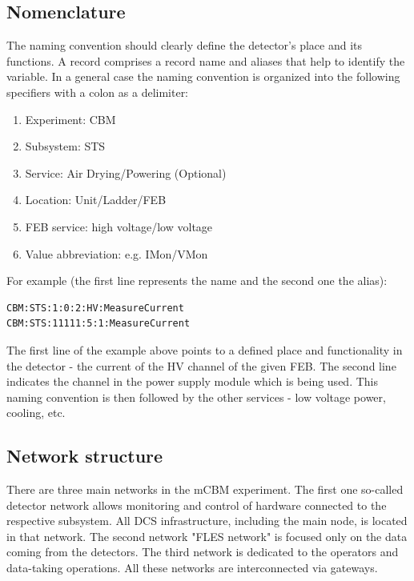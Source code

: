 \subsection{Nomenclature}
The naming convention should clearly define the detector's place and its functions. A record comprises a record name and aliases that help to identify the variable. In a general case the naming convention is organized into the following specifiers with a colon as a delimiter:
\begin{enumerate} 
\item Experiment: CBM
\item Subsystem: \gls{STS}
\item Service: Air Drying/Powering (Optional)
\item Location: Unit/Ladder/FEB
\item \gls{FEB} service: high voltage/low voltage
\item Value abbreviation: e.g. IMon/VMon
\end{enumerate}

For example (the first line represents the name and the second one the alias):
\begin{verbatim}
CBM:STS:1:0:2:HV:MeasureCurrent
CBM:STS:11111:5:1:MeasureCurrent
\end{verbatim}
The first line of the example above points to a defined place and functionality in the detector - the current of the \gls{HV} channel of the given \gls{FEB}. The second line indicates the channel in the power supply module which is being used. This naming convention is then followed by the other services - low voltage power, cooling, etc.  
\subsection{Network structure}
There are three main networks in the mCBM experiment. The first one so-called detector network allows monitoring and control of hardware connected to the respective subsystem. All \gls{DCS} infrastructure, including the main node, is located in that network. The second network "FLES network" is focused only on the data coming from the detectors. The third network is dedicated to the operators and data-taking operations. All these networks are interconnected via gateways.  


